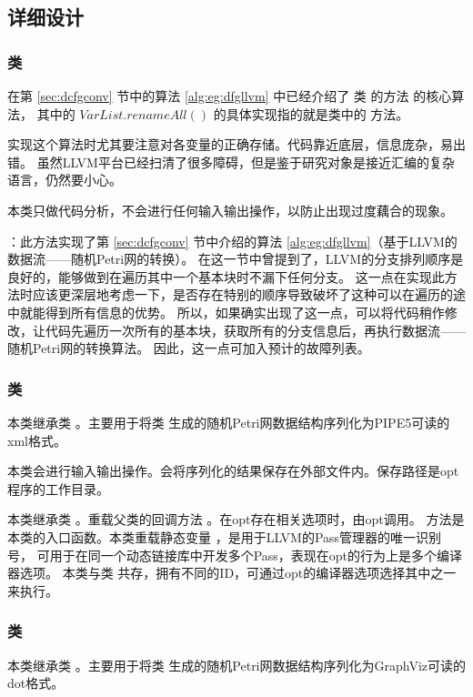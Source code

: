 \subsection{详细设计}

\subsubsection{类 }
在第 \ref{sec:dcfgconv} 节中的算法 \ref{alg:eg:dfgllvm} 中已经介绍了
类  的方法  的核心算法，
其中的 $VarList.renameAll()$ 的具体实现指的就是类中的  方法。

实现这个算法时尤其要注意对各变量的正确存储。代码靠近底层，信息庞杂，易出错。
虽然LLVM平台已经扫清了很多障碍，但是鉴于研究对象是接近汇编的复杂语言，仍然要小心。

本类只做代码分析，不会进行任何输入输出操作，以防止出现过度藕合的现象。

：此方法实现了第 \ref{sec:dcfgconv} 节中介绍的算法 \ref{alg:eg:dfgllvm}（基于LLVM的数据流——随机Petri网的转换）。
在这一节中曾提到了，LLVM的分支排列顺序是良好的，能够做到在遍历其中一个基本块时不漏下任何分支。
这一点在实现此方法时应该更深层地考虑一下，是否存在特别的顺序导致破坏了这种可以在遍历的途中就能得到所有信息的优势。
所以，如果确实出现了这一点，可以将代码稍作修改，让代码先遍历一次所有的基本块，获取所有的分支信息后，再执行数据流——随机Petri网的转换算法。
因此，这一点可加入预计的故障列表。

\subsubsection{类 }
本类继承类 。主要用于将类 生成的随机Petri网数据结构序列化为PIPE5可读的xml格式。

本类会进行输入输出操作。会将序列化的结果保存在外部文件内。保存路径是opt程序的工作目录。

本类继承类 。重载父类的回调方法 。在opt存在相关选项时，由opt调用。
 方法是本类的入口函数。本类重载静态变量 ，是用于LLVM的Pass管理器的唯一识别号，
可用于在同一个动态链接库中开发多个Pass，表现在opt的行为上是多个编译器选项。
本类与类  共存，拥有不同的ID，可通过opt的编译器选项选择其中之一来执行。


\subsubsection{类 }
本类继承类 。主要用于将类 生成的随机Petri网数据结构序列化为GraphViz可读的dot格式。

